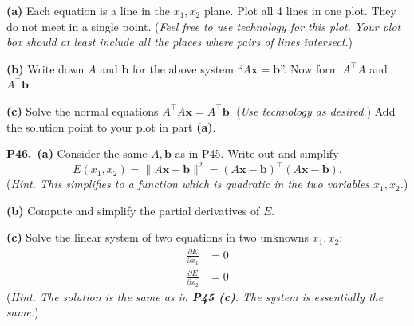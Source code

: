 \documentclass[12pt]{amsart}
\newcommand{\bb}{\bm{b}}
\newcommand{\bx}{\bm{x}}
\newcommand{\prob}[1]{\bigskip\noindent\textbf{#1.}\quad }
\newcommand{\epart}[1]{\medskip\noindent\textbf{(#1)}\quad }
\newcommand{\ppart}[1]{\,\textbf{(#1)}\quad }
\begin{document}
\epart{a} Each equation is a line in the $x_1,x_2$ plane.  Plot all 4 lines in one plot.  They do not meet in a single point.  (\emph{Feel free to use technology for this plot.  Your plot box should at least include all the places where pairs of lines intersect.})

\epart{b} Write down $A$ and $\bb$ for the above system ``$A\bx = \bb$''.  Now form $A^\top A$ and $A^\top \bb$.

\epart{c} Solve the normal equations $A^\top A \bx = A^\top \bb$.  (\emph{Use technology as desired.})  Add the solution point to your plot in part \textbf{(a)}.


\prob{P46}  \ppart{a}  Consider the same $A,\bb$ as in P45.  Write out and simplify
    $$E(x_1,x_2) = \|A\bx - \bb\|^2 = (A\bx - \bb)^\top (A\bx - \bb).$$
(\emph{Hint.  This simplifies to a function which is quadratic in the two variables $x_1,x_2$.})

\epart{b}  Compute and simplify the partial derivatives of $E$.

\epart{c}  Solve the linear system of two equations in two unknowns $x_1,x_2$:
\begin{align*}
\frac{\partial E}{\partial x_1} &= 0 \\
\frac{\partial E}{\partial x_2} &= 0
\end{align*}
(\emph{Hint.  The solution is the same as in \textbf{P45 (c)}.  The system is essentially the same.})
\end{document}
